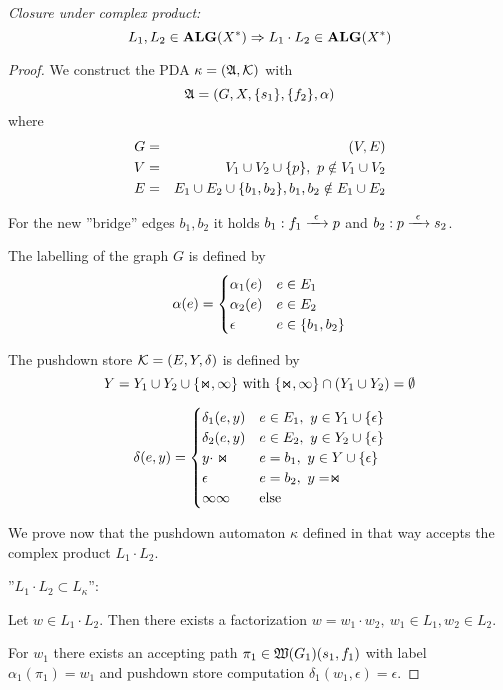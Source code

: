 {\em Closure under complex product:}
\[ L_1, L_2 \in \mbox{{\bf ALG}}(X^*) \Rightarrow L_1 \cdot L_2 \in \mbox{{\bf ALG}}(X^*) \]
\begin{proof}
We construct the PDA $\kappa = (\mbox{$\mathfrak{A}$}, \mbox{$\mathcal{K}$})$ with 
\[\mbox{$\mathfrak{A}$} = (G, X, \mbox{$\{s_1\}$}, \mbox{$\{f_2\}$}, \alpha)\]
where
\begin{eqnarray*}
G &=& (V, E) \\
V &=& V_1 \cup V_2 \cup \mbox{$\{p\}$},\ p \notin V_1 \cup V_2 \\
E &=& E_1 \cup E_2 \cup \mbox{$\{b_1, b_2\}$},b_1, b_2 \notin E_1 \cup E_2
\end{eqnarray*}

For the new ''bridge'' edges $b_1, b_2$ it holds $b_1: f_1 \xrightarrow{\ {\epsilon}\ } p$
and $b_2: p \xrightarrow{\ {\epsilon}\ } s_2$.

The labelling of the graph $G$ is defined by 
\[ \alpha(e) = \begin{cases} 
\alpha_1(e) 	& e \in E_1 \\
\alpha_2(e) 	& e \in E_2 \\
\epsilon 			& e \in \mbox{$\{b_1, b_2\}$} 
\end{cases}\]

\missingfigure

The pushdown store $\mbox{$\mathcal{K}$} = (E, Y, \delta)$ is defined by
\[ Y = Y_1 \cup Y_2 \cup \mbox{$\{\Join, \infty\}$} \text{ with }\mbox{$\{\Join, \infty\}$} \cap
(Y_1 \cup Y_2) = \emptyset \]

\[ \delta(e, y) = \begin{cases}
\delta_1(e, y) 					& e \in E_1,\ y \in Y_1 \cup \mbox{$\{\epsilon\}$} \\
\delta_2(e, y) 					& e \in E_2,\ y \in Y_2 \cup \mbox{$\{\epsilon\}$} \\
y \cdot \Join 					& e = b_1,\ y \in Y \cup \mbox{$\{\epsilon\}$} \\
\epsilon 								& e = b_2,\ y = \Join \\
\infty\infty 						& \text{else}
\end{cases}\]

We prove now that the pushdown automaton $\kappa$ defined in that way accepts
the complex product $L_1 \cdot L_2$.

''$L_1 \cdot L_2 \subset L_{\kappa}$'':

Let $w \in L_1 \cdot L_2$. Then there exists a factorization $w = w_1 \cdot
w_2,\ w_1 \in L_1, w_2 \in L_2$.

For $w_1$ there exists an accepting path $\pi_1 \in \mbox{$\mathfrak{W}({G_1})$}(s_1,
f_1)$ with label $\alpha_1(\pi_1) = w_1$ and pushdown store computation
$\delta_1(w_1, \epsilon) = \epsilon$.


\end{proof}
